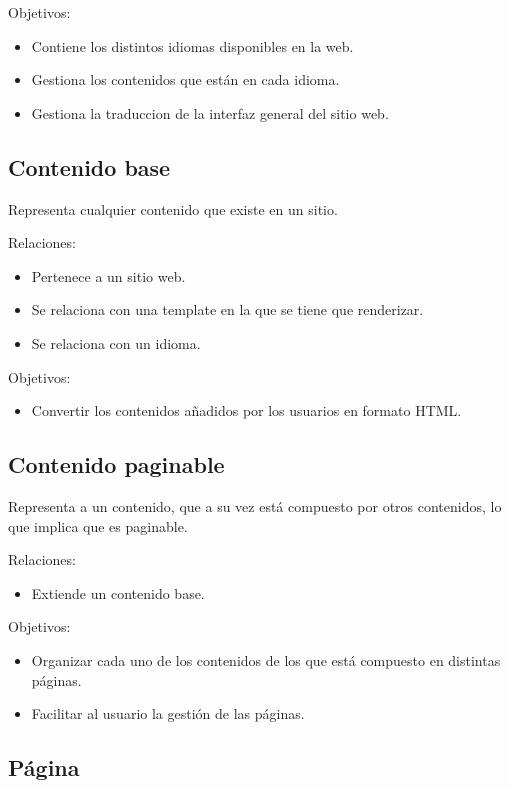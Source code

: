 Objetivos:
\begin{itemize}
    \item Contiene los distintos idiomas disponibles en la web.
    \item Gestiona los contenidos que están en cada idioma.
    \item Gestiona la traduccion de la interfaz general del sitio web.
\end{itemize}

\subsection{Contenido base}

Representa cualquier contenido que existe en un sitio.

Relaciones:
\begin{itemize}
    \item Pertenece a un sitio web.
    \item Se relaciona con una template en la que se tiene que renderizar.
    \item Se relaciona con un idioma.
\end{itemize}

Objetivos:
\begin{itemize}
    \item Convertir los contenidos añadidos por los usuarios en formato HTML.
\end{itemize}

\subsection{Contenido paginable}

Representa a un contenido, que a su vez está compuesto por otros contenidos, lo que implica
que es paginable.

Relaciones:
\begin{itemize}
    \item Extiende un contenido base.
\end{itemize}

Objetivos:
\begin{itemize}
    \item Organizar cada uno de los contenidos de los que está compuesto en distintas páginas.
    \item Facilitar al usuario la gestión de las páginas.
\end{itemize}

\subsection{Página}

